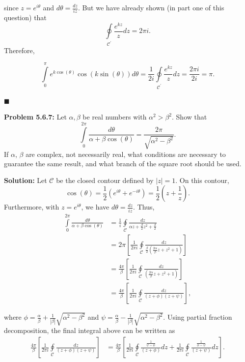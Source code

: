 \documentclass{article}
\newcommand{\mybox}{%
    \collectbox{%
        \setlength{\fboxsep}{1pt}%
        \fbox{\BOXCONTENT}%
    }%
}
\begin{document}
\noindent since $z = e^{i\theta}$ and $d\theta = \frac{dz}{iz}$.  But we have already shown (in part one of this question) that $$\oint\limits_{\mathscr{C}^{\prime}}\frac{e^{kz}}{z} dz = 2\pi i.$$  Therefore, 

$$\int\limits_0^{\pi}e^{k\cos(\theta)}\cos(k\sin(\theta)) d\theta = \frac{1}{2i}\oint\limits_{\mathscr{C}^{\prime}} \frac{e^{kz}}{z} dz = \frac{2\pi i}{2i} = \pi.$$

\hfill$\blacksquare$

\pagebreak

\noindent\mybox{\textbf{Problem 5.6.7:}}  Let $\alpha, \beta$ be real numbers with $\alpha^2 > \beta^2$.  Show that $$\int\limits_0^{2\pi}\frac{d\theta}{\alpha + \beta\cos(\theta)} = \frac{2\pi}{\sqrt{\alpha^2 - \beta^2}}.$$  If $\alpha$, $\beta$ are complex, not necessarily real, what conditions are necessary to guarantee the same result, and what branch of the square root should be used.  

\vspace{5mm}

\noindent\mybox{\textbf{Solution:}} Let $\mathscr{C}$ be the closed contour defined by $|z| = 1$.  On this contour, $$\cos(\theta) = \frac{1}{2}\left(e^{i\theta}+e^{-i\theta}\right) = \frac{1}{2}\left(z + \frac{1}{z}\right).$$ Furthermore, with $z=e^{i\theta}$, we have $d\theta = \frac{dz}{iz}.$  Thus,
\begin{align}
\int\limits_0^{2\pi}\frac{d\theta}{\alpha + \beta\cos(\theta)} &= \frac{1}{i}\oint\limits_{\mathscr{C}}\frac{dz}{\alpha z + \frac{\beta}{2}z^2 + \frac{\beta}{2}} \\
&= 2\pi \left[\frac{1}{2\pi i}\oint\limits_{\mathscr{C}}\frac{dz}{\frac{\beta}{2}(\frac{2\alpha}{\beta}z + z^2 + 1)}\right] \\
&= \frac{4\pi}{\beta}\left[\frac{1}{2\pi i}\oint\limits_{\mathscr{C}}\frac{dz}{(\frac{2\alpha}{\beta}z + z^2 + 1)}\right] \\
&= \frac{4\pi}{\beta}\left[\frac{1}{2\pi i} \oint\limits_{\mathscr{C}}\frac{dz}{(z+\phi)(z+\psi)}\right],
\end{align}

\noindent where $\phi = \frac{\alpha}{\beta} + \frac{1}{|\beta|}\sqrt{\alpha^2 - \beta^2}$ and $\psi = \frac{\alpha}{\beta} - \frac{1}{|\beta|}\sqrt{\alpha^2 - \beta^2}$.  Using partial fraction decomposition, the final integral above can be written as 
\begin{align}
\frac{4\pi}{\beta}\left[\frac{1}{2\pi i} \oint\limits_{\mathscr{C}}\frac{dz}{(z+\phi)(z+\psi)} \right] &= \frac{4\pi}{\beta}\left[\frac{1}{2\pi i} \oint\limits_{\mathscr{C}}\frac{\frac{1}{\psi - \phi}}{(z+\phi)}dz +  \frac{1}{2\pi i} \oint\limits_{\mathscr{C}}\frac{\frac{1}{\phi - \psi}}{(z+\psi)}dz\right].
\end{align}
\end{document}
